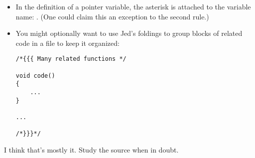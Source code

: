 \begin{itemize}
  \item In the definition of a pointer variable, the asterisk is attached
    to the variable name: . (One could claim this an 
    exception to the second rule.)
    
  \item You might optionally want to use Jed's foldings to group blocks
    of related code in a file to keep it organized:

\begin{verbatim}    
/*{{{ Many related functions */
	
void code()
{
    ...	
}

...

/*}}}*/
\end{verbatim}
\end{itemize}

I think that's mostly it. Study the source when in doubt.
